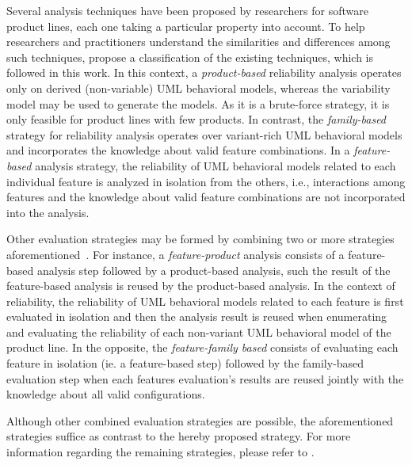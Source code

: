 Several analysis techniques have been proposed by researchers for software
product lines, each one taking a particular property into account. To help
researchers and practitioners  understand the similarities and differences among
such techniques,  \citet{thum_classification_2014} propose a classification of
the existing techniques, which is followed in this work. In this context, a
\textit{product-based} reliability analysis operates only on derived
(non-variable) UML behavioral models, whereas the variability model may be used
to generate the models. As it is a brute-force strategy, it is only feasible for
product lines with few products. In contrast, the \textit{family-based} strategy
for reliability analysis operates over variant-rich UML behavioral models and
incorporates the knowledge about valid feature combinations. 
In a \textit{feature-based}  analysis strategy, the reliability of UML
behavioral models related to each individual feature is analyzed in isolation
from the others, i.e., interactions among features and the knowledge about valid
feature combinations are not incorporated into the analysis. 

Other evaluation strategies may be formed by combining two or more strategies
aforementioned~\cite{thum_classification_2014}. For instance, a
\textit{feature-product} analysis consists  of a feature-based analysis step
followed by a product-based analysis, such the result of the feature-based
analysis is reused by the product-based analysis.  In the context of
reliability, the reliability of UML behavioral models related to each feature is
first evaluated in isolation and then the analysis result is reused when
enumerating and evaluating the reliability of each non-variant UML behavioral
model of the product line. 
In the opposite, the \textit{feature-family based} consists of evaluating each
feature in isolation (ie. a feature-based step) followed by the family-based
evaluation step when each features evaluation's results are reused jointly
with the knowledge about all valid configurations. 

Although other combined evaluation strategies are possible, the aforementioned
strategies suffice as contrast to the hereby proposed strategy.  For more
information regarding the remaining strategies, please refer to
\citet{thum_classification_2014}.








